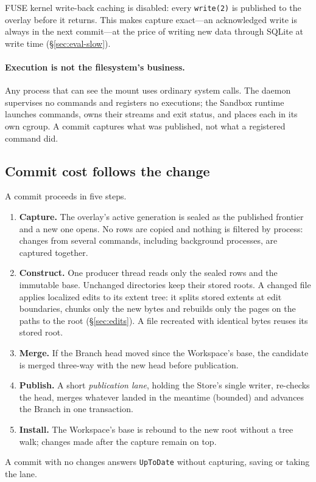 \documentclass[letterpaper,twocolumn,10pt]{article}
\newcommand{\ws}{Workspace}
\begin{document}
FUSE kernel write-back caching is disabled: every \texttt{write(2)} is
published to the overlay before it returns. This makes capture exact---an
acknowledged write is always in the next commit---at the price of writing
new data through SQLite at write time (\S\ref{sec:eval-slow}).

\paragraph{Execution is not the filesystem's business.} Any process that
can see the mount uses ordinary system calls. The daemon supervises no
commands and registers no executions; the Sandbox runtime launches commands,
owns their streams and exit status, and places each in its own cgroup. A
commit captures what was published, not what a registered command did.

\subsection{Commit cost follows the change}
\label{sec:commit}

A commit proceeds in five steps.
\begin{enumerate}
\item \textbf{Capture.} The overlay's active generation is sealed as the
  published frontier and a new one opens. No rows are copied and nothing is
  filtered by process: changes from several commands, including background
  processes, are captured together.
\item \textbf{Construct.} One producer thread reads only the sealed rows and
  the immutable base. Unchanged directories keep their stored roots. A
  changed file applies localized edits to its extent tree: it splits stored
  extents at edit boundaries, chunks only the new bytes and rebuilds only
  the pages on the paths to the root (\S\ref{sec:edits}). A file recreated
  with identical bytes reuses its stored root.
\item \textbf{Merge.} If the Branch head moved since the \ws{}'s base, the
  candidate is merged three-way with the new head before publication.
\item \textbf{Publish.} A short \emph{publication lane}, holding the
  Store's single writer, re-checks the head, merges whatever landed in the
  meantime (bounded) and advances the Branch in one transaction.
\item \textbf{Install.} The \ws{}'s base is rebound to the new root without
  a tree walk; changes made after the capture remain on top.
\end{enumerate}
A commit with no changes answers \texttt{UpToDate} without capturing,
saving or taking the lane.
\end{document}
